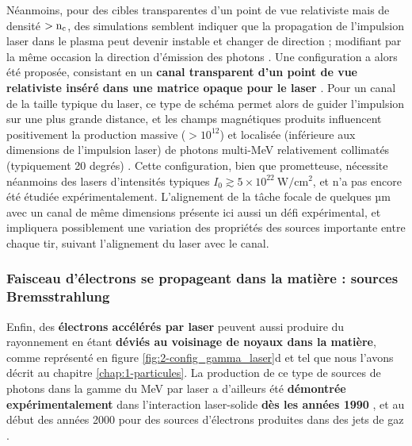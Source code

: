 \begin{refsection}
Néanmoins, pour des cibles transparentes d'un point de vue relativiste mais de densité $> \rm n_c$, des simulations semblent indiquer que la propagation de l'impulsion laser dans le plasma peut devenir instable et changer de direction ; modifiant par la même occasion la direction d'émission des photons \parencite{stark_2016,huang_2017a}. Une configuration a alors été proposée, consistant en un \textbf{canal transparent d'un point de vue relativiste inséré dans une matrice opaque pour le laser} \parencite{stark_2016}. Pour un canal de la taille typique du laser, ce type de schéma permet alors de guider l'impulsion sur une plus grande distance, et les champs magnétiques produits influencent positivement la production massive ($> 10^{12}$) et localisée (inférieure aux dimensions de l'impulsion laser) de photons multi-MeV relativement collimatés (typiquement 20 degrés) \parencite{stark_2016, long_2019, huang_2017a}. Cette configuration, bien que prometteuse, nécessite néanmoins des lasers d'intensités typiques $I_0 \gtrsim 5 \times 10^{22} ~ \si{\W \per \cm^2}$, et n'a pas encore été étudiée expérimentalement. L'alignement de la tâche focale de quelques µm avec un canal de même dimensions présente ici aussi un défi expérimental, et impliquera possiblement une variation des propriétés des sources importante entre chaque tir, suivant l'alignement du laser avec le canal.

\subsubsection{Faisceau d'électrons se propageant dans la matière : sources Bremsstrahlung}

Enfin, des \textbf{électrons accélérés par laser} peuvent aussi produire du rayonnement en étant \textbf{déviés au voisinage de noyaux dans la matière}, comme représenté en figure \ref{fig:2-config_gamma_laser}d et tel que nous l'avons décrit au chapitre \ref{chap:1-particules}.
La production de ce type de sources de photons dans la gamme du MeV par laser a d'ailleurs été \textbf{démontrée expérimentalement} dans l'interaction laser-solide \textbf{dès les années 1990} \parencite{kmetec_1992, perry_1999a, norreys_1999}, et au début des années 2000 pour des sources d'électrons produites dans des jets de gaz \parencite{edwards_2002}.


\end{refsection}
